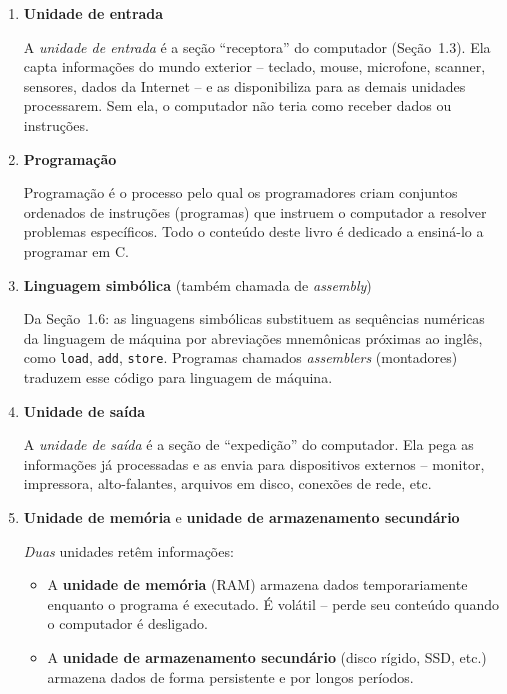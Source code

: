 \documentclass[12pt,a4paper]{article}
\begin{document}
\begin{respostabox}

\begin{enumerate}[label=\textbf{\alph*)}]

  \item \textbf{Unidade de entrada}

  A \textit{unidade de entrada} é a seção ``receptora'' do computador (Seção~1.3).
  Ela capta informações do mundo exterior -- teclado, mouse, microfone, scanner,
  sensores, dados da Internet -- e as disponibiliza para as demais unidades processarem.
  Sem ela, o computador não teria como receber dados ou instruções.

  \medskip
  \item \textbf{Programação}

  Programação é o processo pelo qual os programadores criam conjuntos ordenados de
  instruções (programas) que instruem o computador a resolver problemas específicos.
  Todo o conteúdo deste livro é dedicado a ensiná-lo a programar em C.

  \medskip
  \item \textbf{Linguagem simbólica} (também chamada de \textit{assembly})

  Da Seção~1.6: as linguagens simbólicas substituem as sequências numéricas da
  linguagem de máquina por abreviações mnemônicas próximas ao inglês, como
  \texttt{load}, \texttt{add}, \texttt{store}. Programas chamados
  \textit{assemblers} (montadores) traduzem esse código para linguagem de máquina.

  \medskip
  \item \textbf{Unidade de saída}

  A \textit{unidade de saída} é a seção de ``expedição'' do computador. Ela pega
  as informações já processadas e as envia para dispositivos externos -- monitor,
  impressora, alto-falantes, arquivos em disco, conexões de rede, etc.

  \medskip
  \item \textbf{Unidade de memória} e \textbf{unidade de armazenamento secundário}

  \textit{Duas} unidades retêm informações:
  \begin{itemize}
    \item A \textbf{unidade de memória} (RAM) armazena dados temporariamente enquanto
    o programa é executado. É volátil -- perde seu conteúdo quando o computador é
    desligado.
    \item A \textbf{unidade de armazenamento secundário} (disco rígido, SSD, etc.)
    armazena dados de forma persistente e por longos períodos.
  \end{itemize}


\end{enumerate}
\end{respostabox}
\end{document}
